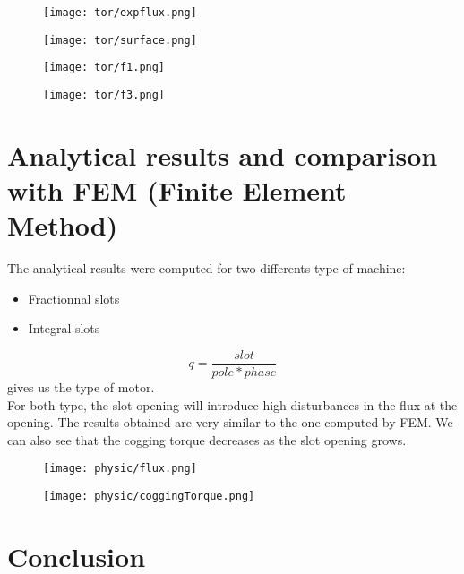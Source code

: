 \begin{minipage}{0.55\linewidth}
\begin{figure}[H]
    \texttt{[image: tor/expflux.png]}
\end{figure}
\end{minipage}\hfill
\begin{minipage}{0.4\linewidth}
\begin{figure}[H]
    \texttt{[image: tor/surface.png]}
\end{figure}
\end{minipage}

\begin{figure}[H]
    \centering
    \texttt{[image: tor/f1.png]}
\end{figure}

\begin{figure}[H]
    \centering
    \texttt{[image: tor/f3.png]}
\end{figure}

\section{Analytical results and comparison with FEM (Finite Element Method)}
The analytical results were computed for two differents type of machine:
\begin{itemize}
    \item Fractionnal slots
    \item Integral slots
\end{itemize} 
$$q = \frac{slot}{pole*phase}$$ gives us the type of motor. \\ For both type, the slot opening will introduce high disturbances in the flux at the opening. The results obtained are very similar to the one computed by FEM. We can also see that the cogging torque decreases as the slot opening grows.
\begin{figure}[H]
    \centering
    \texttt{[image: physic/flux.png]}
\end{figure}
\begin{figure}[H]
    \centering
    \texttt{[image: physic/coggingTorque.png]}
\end{figure}


\section{Conclusion}

